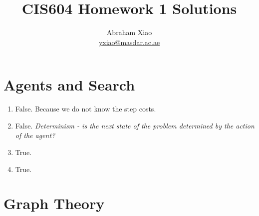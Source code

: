 \documentclass[12pt]{article}
\begin{document}
\title{CIS604 Homework 1 Solutions}
\author{Abraham Xiao\\
\url{yxiao@masdar.ac.ae}}
\maketitle{}

\section{Agents and Search}
\label{sec:agents-search}

\begin{enumerate}
\item False. Because we do not know the step costs.
\item False. \emph{Determinism - is the next state of the problem
    determined by the action of the agent?}
\item True.
\item True.
\end{enumerate}

\section{Graph Theory}
\label{sec:graph-theory}









\end{document}
